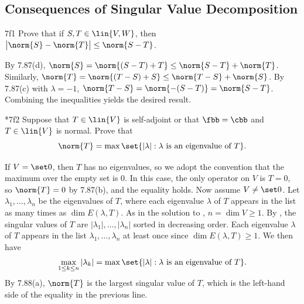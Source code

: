 \subsection{Consequences of Singular Value Decomposition}

\begin{exercise}{7f1}
    Prove that if $S, T \in \lin{V, W}$, then $\bigl|\norm{S} - \norm{T}\bigr| \leq \norm{S - T}$.

\end{exercise}

\begin{sol}
    By 7.87(d), $\norm{S} = \norm{(S - T) + T} \leq \norm{S - T} + \norm{T}$.
    Similarly, $\norm{T} = \norm{(T - S) + S} \leq \norm{T - S} + \norm{S}$.
    By 7.87(c) with $\lambda = -1$, $\norm{T - S} = \norm{-(S - T)} = \norm{S - T}$.
    Combining the inequalities yields the desired result.
\end{sol}

\begin{exercise}*{7f2}
    Suppose that $T \in \lin{V}$ is self-adjoint or that $\fbb = \cbb$ and $T \in \lin{V}$ is normal.
    Prove that
    \[
        \norm{T} = \max\set{|\lambda| : \lambda \text{ is an eigenvalue of } T}.
    \]
\end{exercise}

\begin{sol}
    If $V = \set 0$, then $T$ has no eigenvalues, so we adopt the convention that the maximum over the empty set is $0$.
    In this case, the only operator on $V$ is $T = 0$, so $\norm{T} = 0$ by 7.87(b), and the equality holds.
    Now assume $V \neq \set 0$.
    Let $\lambda_1, \ldots, \lambda_n$ be the eigenvalues of $T$, where each eigenvalue $\lambda$ of $T$ appears in the list as many times as $\dim E(\lambda, T)$.
    As in the solution to , $n = \dim V \geq 1$.
    By , the singular values of $T$ are $|\lambda_1|, \ldots, |\lambda_n|$ sorted in decreasing order.
    Each eigenvalue $\lambda$ of $T$ appears in the list $\lambda_1, \ldots, \lambda_n$ at least once since $\dim E(\lambda, T) \geq 1$.
    We then have
    \[
        \max_{1 \leq k \leq n} |\lambda_k| = \max\set{|\lambda| : \lambda \text{ is an eigenvalue of } T}.
    \]
    By 7.88(a), $\norm{T}$ is the largest singular value of $T$, which is the left-hand side of the equality in the previous line.
\end{sol}

